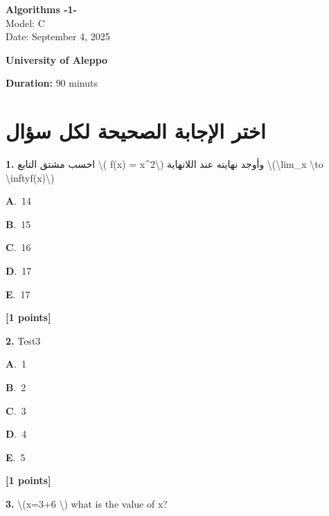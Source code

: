 \documentclass[12pt]{article}
\newcommand{\choice}[3]{%
  \noindent\textbf{#1}.~#2\hfill#3\par\vspace{0.25em}
}
\begin{document}
\begin{flushright}
{\Large \textbf{{\textenglish{Algorithms -1-}}}}\\[0.25em]
{\normalsize \textenglish{Model: }{\textenglish{C}}}\\[0.1em]
{\normalsize \textenglish{Date: }{\textenglish{September 4, 2025}}}
\end{flushright}

\vspace{0.6cm}

\noindent
\begin{minipage}[t]{0.65\textwidth}
  \raggedright
  \textbf{{\textenglish{University of Aleppo}}}\\[0.3em]
\end{minipage}\hfill
\begin{minipage}[t]{0.3\textwidth}
  \raggedleft
  \textenglish{\textbf{Duration: }}{\textenglish{90 minuts}}
\end{minipage}

\vspace{0.9cm}

\section*{اختر الإجابة الصحيحة لكل سؤال}

\noindent \textbf{\textenglish{1.}} {\textarabic{احسب مشتق التابع \textbackslash{}( f(x) = x\^{}2\textbackslash{}) وأوجد نهايته عند اللانهاية \textbackslash{}(\textbackslash{}lim\_{x \textbackslash{}to \textbackslash{}infty}f(x)\textbackslash{})}}

\noindent\choice{A}{{\textenglish{14}}}{}
\noindent\choice{B}{{\textenglish{15}}}{}
\noindent\choice{C}{{\textenglish{16}}}{}
\noindent\choice{D}{{\textenglish{17}}}{}
\noindent\choice{E}{{\textenglish{17}}}{}
\hfill \textbf{[1 points]}\vspace{0.5em}

\noindent \textbf{\textenglish{2.}} {\textenglish{Test3}}

\noindent\choice{A}{{\textenglish{1}}}{}
\noindent\choice{B}{{\textenglish{2}}}{}
\noindent\choice{C}{{\textenglish{3}}}{}
\noindent\choice{D}{{\textenglish{4}}}{}
\noindent\choice{E}{{\textenglish{5}}}{}
\hfill \textbf{[1 points]}\vspace{0.5em}

\noindent \textbf{\textenglish{3.}} {\textenglish{\textbackslash{}(x=3+6 \textbackslash{}) what is the value of x?}}
\end{document}
